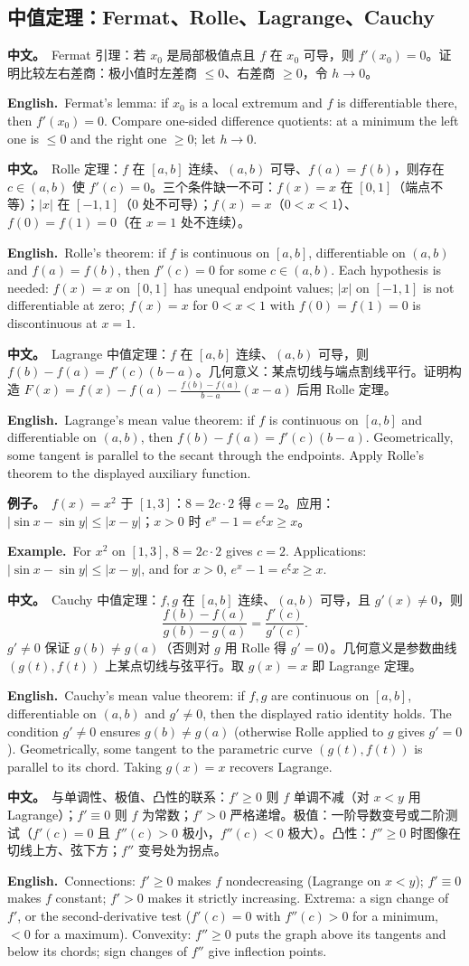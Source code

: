 \documentclass[UTF8,11pt,a4paper]{ctexart}
\newcommand{\BOTH}[2]{\par\noindent\textbf{中文。}\ #1\par\noindent\textbf{English.}\ #2\par}
\newcommand{\EX}[2]{\par\noindent\textbf{例子。}\ #1\par\noindent\textbf{Example.}\ #2\par}
\begin{document}
\subsection{中值定理：Fermat、Rolle、Lagrange、Cauchy}
\BOTH{Fermat 引理：若 $x_0$ 是局部极值点且 $f$ 在 $x_0$ 可导，则 $f'(x_0)=0$。证明比较左右差商：极小值时左差商 $\le0$、右差商 $\ge0$，令 $h\to0$。}{Fermat's lemma: if $x_0$ is a local extremum and $f$ is differentiable there, then $f'(x_0)=0$. Compare one-sided difference quotients: at a minimum the left one is $\le0$ and the right one $\ge0$; let $h\to0$.}
\BOTH{Rolle 定理：$f$ 在 $[a,b]$ 连续、$(a,b)$ 可导、$f(a)=f(b)$，则存在 $c\in(a,b)$ 使 $f'(c)=0$。三个条件缺一不可：$f(x)=x$ 在 $[0,1]$（端点不等）；$|x|$ 在 $[-1,1]$（$0$ 处不可导）；$f(x)=x$（$0<x<1$）、$f(0)=f(1)=0$（在 $x=1$ 处不连续）。}{Rolle's theorem: if $f$ is continuous on $[a,b]$, differentiable on $(a,b)$ and $f(a)=f(b)$, then $f'(c)=0$ for some $c\in(a,b)$. Each hypothesis is needed: $f(x)=x$ on $[0,1]$ has unequal endpoint values; $|x|$ on $[-1,1]$ is not differentiable at zero; $f(x)=x$ for $0<x<1$ with $f(0)=f(1)=0$ is discontinuous at $x=1$.}
\BOTH{Lagrange 中值定理：$f$ 在 $[a,b]$ 连续、$(a,b)$ 可导，则 $f(b)-f(a)=f'(c)(b-a)$。几何意义：某点切线与端点割线平行。证明构造 $F(x)=f(x)-f(a)-\frac{f(b)-f(a)}{b-a}(x-a)$ 后用 Rolle 定理。}{Lagrange's mean value theorem: if $f$ is continuous on $[a,b]$ and differentiable on $(a,b)$, then $f(b)-f(a)=f'(c)(b-a)$. Geometrically, some tangent is parallel to the secant through the endpoints. Apply Rolle's theorem to the displayed auxiliary function.}
\EX{$f(x)=x^2$ 于 $[1,3]$：$8=2c\cdot2$ 得 $c=2$。应用：$|\sin x-\sin y|\le|x-y|$；$x>0$ 时 $e^x-1=e^{\xi}x\ge x$。}{For $x^2$ on $[1,3]$, $8=2c\cdot2$ gives $c=2$. Applications: $|\sin x-\sin y|\le|x-y|$, and for $x>0$, $e^x-1=e^{\xi}x\ge x$.}
\BOTH{Cauchy 中值定理：$f,g$ 在 $[a,b]$ 连续、$(a,b)$ 可导，且 $g'(x)\ne0$，则
\[
\frac{f(b)-f(a)}{g(b)-g(a)}=\frac{f'(c)}{g'(c)}.
\]
$g'\ne0$ 保证 $g(b)\ne g(a)$（否则对 $g$ 用 Rolle 得 $g'=0$）。几何意义是参数曲线 $(g(t),f(t))$ 上某点切线与弦平行。取 $g(x)=x$ 即 Lagrange 定理。}{Cauchy's mean value theorem: if $f,g$ are continuous on $[a,b]$, differentiable on $(a,b)$ and $g'\ne0$, then the displayed ratio identity holds. The condition $g'\ne0$ ensures $g(b)\ne g(a)$ (otherwise Rolle applied to $g$ gives $g'=0$). Geometrically, some tangent to the parametric curve $(g(t),f(t))$ is parallel to its chord. Taking $g(x)=x$ recovers Lagrange.}
\BOTH{与单调性、极值、凸性的联系：$f'\ge0$ 则 $f$ 单调不减（对 $x<y$ 用 Lagrange）；$f'\equiv0$ 则 $f$ 为常数；$f'>0$ 严格递增。极值：一阶导数变号或二阶测试（$f'(c)=0$ 且 $f''(c)>0$ 极小，$f''(c)<0$ 极大）。凸性：$f''\ge0$ 时图像在切线上方、弦下方；$f''$ 变号处为拐点。}{Connections: $f'\ge0$ makes $f$ nondecreasing (Lagrange on $x<y$); $f'\equiv0$ makes $f$ constant; $f'>0$ makes it strictly increasing. Extrema: a sign change of $f'$, or the second-derivative test ($f'(c)=0$ with $f''(c)>0$ for a minimum, $<0$ for a maximum). Convexity: $f''\ge0$ puts the graph above its tangents and below its chords; sign changes of $f''$ give inflection points.}
\end{document}
